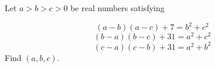 Let $a>b>c>0$ be real numbers satisfying

$$(a-b)(a-c)+7=b^2+c^2$$$$(b-a)(b-c)+31=a^2+c^2$$$$(c-a)(c-b)+31=a^2+b^2$$Find $(a,b,c).$
